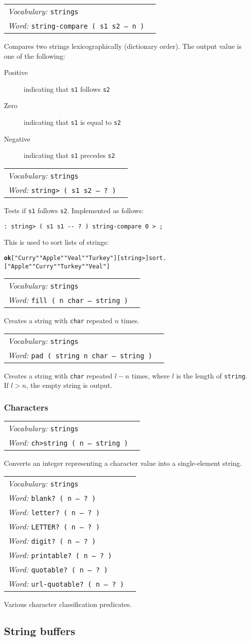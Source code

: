 \documentclass{book}
\newcommand{\vocabulary}[1]{\emph{Vocabulary:} \texttt{#1}&\\}
\newcommand{\ordinaryword}[2]{\index{\texttt{#1}}\emph{Word:} \texttt{#2}&\\}
\newcommand{\wordtable}[1]{


\begin{tabularx}{12cm}{lX}
\hline
#1
\hline
\end{tabularx}

}
\begin{document}
\wordtable{
\vocabulary{strings}
\ordinaryword{string-compare}{string-compare~( s1 s2 -- n )}

}
Compares two strings lexicographically (dictionary order). The output value is one of the following:
\begin{description}
\item[Positive] indicating that \texttt{s1} follows \texttt{s2}
\item[Zero] indicating that \texttt{s1} is equal to \texttt{s2}
\item[Negative] indicating that \texttt{s1} precedes \texttt{s2}
\end{description}
\wordtable{
\vocabulary{strings}
\ordinaryword{string>}{string> ( s1 s2 -- ?~)}

}
Tests if \texttt{s1} follows \texttt{s2}. Implemented as follows:
\begin{verbatim}
: string> ( s1 s1 -- ? ) string-compare 0 > ;
\end{verbatim}
This is used to sort lists of strings:
\begin{alltt}
\textbf{ok} [ "Curry" "Apple" "Veal" "Turkey" ] [ string> ] sort .
[ "Apple" "Curry" "Turkey" "Veal" ]
\end{alltt}
\wordtable{
\vocabulary{strings}
\ordinaryword{fill}{fill~( n char -- string )}

}
Creates a string with \texttt{char} repeated $n$ times.
\wordtable{
\vocabulary{strings}
\ordinaryword{pad}{pad~( string n char -- string )}

}
Creates a string with \texttt{char} repeated $l-n$ times, where $l$ is the length of \texttt{string}. If $l>n$, the empty string is output.

\subsubsection{Characters}

\wordtable{
\vocabulary{strings}
\ordinaryword{ch>string}{ch>string ( n -- string )}
}
Converts an integer representing a character value into a single-element string.
\wordtable{
\vocabulary{strings}
\ordinaryword{blank?}{blank?~( n -- ?~)}
\ordinaryword{letter?}{letter?~( n -- ?~)}
\ordinaryword{LETTER?}{LETTER?~( n -- ?~)}
\ordinaryword{digit?}{digit?~( n -- ?~)}
\ordinaryword{printable?}{printable?~( n -- ?~)}
\ordinaryword{quotable?}{quotable?~( n -- ?~)}
\ordinaryword{url-quotable?}{url-quotable?~( n -- ?~)}
}
Various character classification predicates.

\subsection{String buffers}\label{string-buffers}
\end{document}
